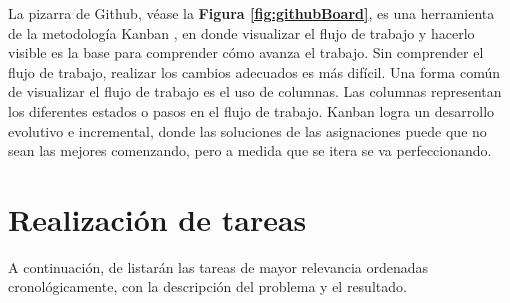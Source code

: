 La pizarra de Github, véase la \textbf{Figura \ref{fig:githubBoard}}, es una herramienta de la metodología Kanban \cite{BookKanban}, en donde visualizar el flujo de trabajo y hacerlo visible es la base para comprender cómo avanza el trabajo. Sin comprender el flujo de trabajo, realizar los cambios adecuados es más difícil. Una forma común de visualizar el flujo de trabajo es el uso de columnas. Las columnas representan los diferentes estados o pasos en el flujo de trabajo. Kanban logra un desarrollo evolutivo e incremental, donde las soluciones de las asignaciones puede que no sean las mejores comenzando, pero a medida que se itera se va perfeccionando.

\section{Realización de tareas}
A continuación, de listarán las tareas de mayor relevancia ordenadas cronológicamente, con la descripción del problema y el resultado.

